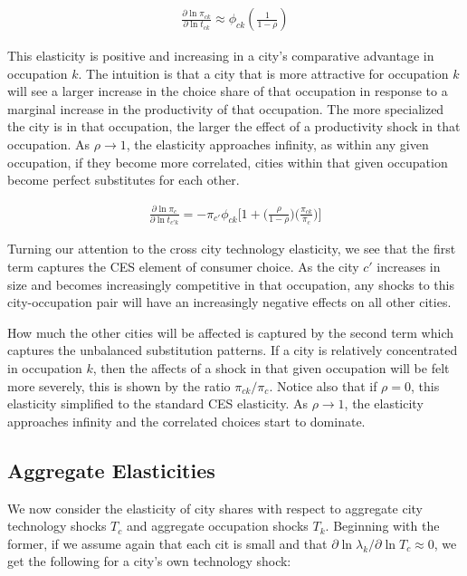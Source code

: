 \documentclass[10pt]{article}
\begin{document}
\begin{align}
    \frac{\partial \ln \pi_{ck}}{\partial \ln t_{ck}} \approx \phi_{ck} \left( \frac{1}{1 - \rho} \right)
    \label{co_own_elasticity}
\end{align}

This elasticity is positive and increasing in a city's comparative advantage in occupation $k$. The intuition is that a city that is more attractive for occupation $k$ will see a larger increase in the choice share of that occupation in response to a marginal increase in the productivity of that occupation. The more specialized the city is in that occupation, the larger the effect of a productivity shock in that occupation. As $\rho \rightarrow 1$, the elasticity approaches infinity, as within any given occupation, if they become more correlated, cities within that given occupation become perfect substitutes for each other.

\begin{align}
    \frac{\partial\ln{\pi_{c}}}{\partial\ln{t_{{c'}k}}} = -{\pi_{c'}}{\phi_{ck}}\Big[1+\Big(\frac{\rho}{1-\rho}\Big)\Big(\frac{\pi_{ck}}{\pi_{c}}\Big)\Big]
    \label{co_cross_elasticity}
\end{align}

Turning our attention to the cross city technology elasticity, we see that the first term captures the CES element of consumer choice. As the city $c'$ increases in size and becomes increasingly competitive in that occupation, any shocks to this city-occupation pair will have an increasingly negative effects on all other cities.

How much the other cities will be affected is captured by the second term which captures the unbalanced substitution patterns. If a city is relatively concentrated in occupation $k$, then the affects of a shock in that given occupation will be felt more severely, this is shown by the ratio $\pi_{ck} / \pi_c$. Notice also that if $\rho = 0$, this elasticity simplified to the standard CES elasticity. As $\rho \rightarrow 1$, the elasticity approaches infinity and the correlated choices start to dominate.

\subsection{Aggregate Elasticities}

We now consider the elasticity of city shares with respect to aggregate city technology shocks $T_c$ and aggregate occupation shocks $T_k$. Beginning with the former, if we assume again that each cit is small and that $\partial \ln \lambda_k / \partial \ln T_c \approx 0$, we get the following for a city's own technology shock:
\end{document}
